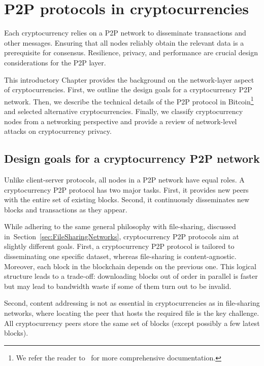\chapter{P2P protocols in cryptocurrencies}

\label{Chapter02IntroP2P}

Each cryptocurrency relies on a P2P network to disseminate transactions and other messages.
Ensuring that all nodes reliably obtain the relevant data is a prerequisite for consensus.
Resilience, privacy, and performance are crucial design considerations for the P2P layer.

This introductory Chapter provides the background on the network-layer aspect of cryptocurrencies.
First, we outline the design goals for a cryptocurrency P2P network.
Then, we describe the technical details of the P2P protocol in Bitcoin\footnote{We refer the reader to~\cite{BitcoinWiki, Garay2015} for more comprehensive documentation.} and selected alternative cryptocurrencies.
Finally, we classify cryptocurrency nodes from a networking perspective and provide a review of network-level attacks on cryptocurrency privacy.


\section{Design goals for a cryptocurrency P2P network}

Unlike client-server protocols, all nodes in a P2P network have equal roles.
A cryptocurrency P2P protocol has two major tasks.
First, it provides new peers with the entire set of existing blocks.
Second, it continuously disseminates new blocks and transactions as they appear.

While adhering to the same general philosophy with file-sharing, discussed in~Section~\ref{sec:FileSharingNetworks}, cryptocurrency P2P protocols aim at slightly different goals.
First, a cryptocurrency P2P protocol is tailored to disseminating one specific dataset, whereas file-sharing is content-agnostic.
Moreover, each block in the blockchain depends on the previous one.
This logical structure leads to a trade-off: downloading blocks out of order in parallel is faster but may lead to bandwidth waste if some of them turn out to be invalid.

Second, content addressing is not as essential in cryptocurrencies as in file-sharing networks, where locating the peer that hosts the required file is the key challenge.
All cryptocurrency peers store the same set of blocks (except possibly a few latest blocks).

